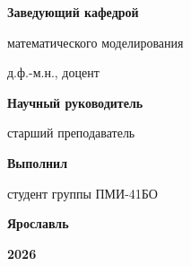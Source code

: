\begin{titlepage}
\begingroup\small
\noindent\begin{minipage}[t]{0.40\linewidth}
\textbf{Заведующий кафедрой}\par
математического моделирования\par\vspace{0.2em}
д.ф.-м.н., доцент\par\vspace{0.6em}
%
\end{minipage}\hfill
\begin{minipage}[t]{0.40\linewidth}\raggedright
\textbf{Научный руководитель}\par\vspace{0.2em}
старший преподаватель\par\vspace{0.6em}
\par\vspace{1em}

\textbf{Выполнил}\par\vspace{0.2em}
студент группы ПМИ-41БО\par\vspace{0.6em}
%
\end{minipage}
\endgroup

\vspace{1.5cm}

\textbf{Ярославль}\par\vspace{0.25em}
\textbf{2026}
\end{titlepage}
